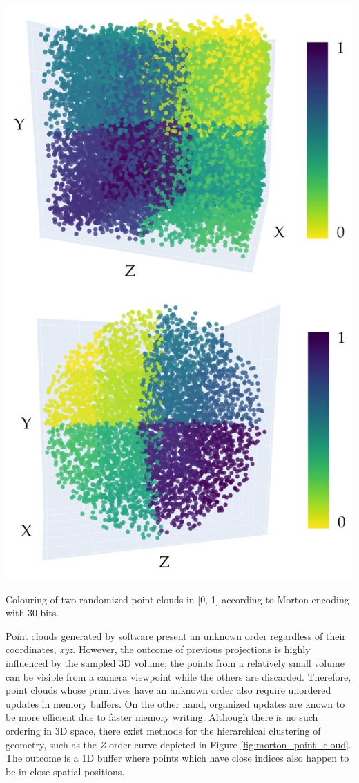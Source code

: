 \begin{marginfigure}[-1cm]
    \centering
    \includegraphics[width=\linewidth]{figs/multi_thermal_projection/point_cloud_morton.png}
    \caption{Colouring of two randomized point clouds in [0, 1] according to Morton encoding with 30 bits. }
	\label{fig:morton_point_cloud}
\end{marginfigure}
Point clouds generated by software present an unknown order regardless of their coordinates, \textit{xyz}. However, the outcome of previous projections is highly influenced by the sampled 3D volume; the points from a relatively small volume can be visible from a camera viewpoint while the others are discarded. Therefore, point clouds whose primitives have an unknown order also require unordered updates in memory buffers. On the other hand, organized updates are known to be more efficient due to faster memory writing. Although there is no such ordering in 3D space, there exist methods for the hierarchical clustering of geometry, such as the \textit{Z}-order curve depicted in Figure \ref{fig:morton_point_cloud}. The outcome is a 1D buffer where points which have close indices also happen to be in close spatial positions. 

